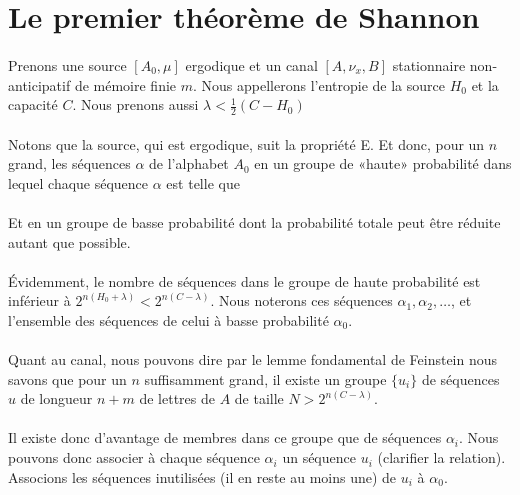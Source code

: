 \documentclass[a4paper,12pt]{article}
\begin{document}
\section{Le premier théorème de Shannon}

	\paragraph{}
	Prenons une source $[A_0,\mu]$ ergodique et un canal $[A,\nu_x,B]$ stationnaire non-anticipatif de mémoire finie $m$. 
	Nous appellerons l'entropie de la source $H_0$ et la capacité $C$. Nous prenons aussi $\lambda<\frac{1}{2}(C-H_0)$

	\paragraph{}
	Notons que la source, qui est ergodique, suit la propriété E. Et donc, pour un $n$ grand,  les séquences $\alpha$ de l'alphabet 
	$A_0$ en un groupe de «haute» probabilité dans lequel chaque séquence $\alpha$ est telle que
	
	\paragraph{}
	Et en un groupe de basse probabilité dont la probabilité totale peut être réduite autant que possible.

	\paragraph{}
	Évidemment, le nombre de séquences dans le groupe de haute probabilité est inférieur à $2^{n(H_0+\lambda)}<2^{n(C-\lambda)}$.
	Nous noterons ces séquences $\alpha_1,\alpha_2,\dots$, et l'ensemble des séquences de celui à basse probabilité $\alpha_0$.
	
	\paragraph{}
	Quant au canal, nous pouvons dire par le lemme fondamental de Feinstein nous savons que pour un $n$ suffisamment grand, 
	il existe un groupe $\{u_i\}$ de séquences $u$ de longueur $n+m$ de lettres de $A$ de taille $N > 2^{n(C-\lambda)}$.
	
	\paragraph{}
	Il existe donc d'avantage de membres dans ce groupe que de séquences $\alpha_i$. Nous pouvons donc associer à chaque séquence $\alpha_i$
	un séquence $u_i$ (clarifier la relation). Associons les séquences inutilisées (il en reste au moins une) de $u_i$ à $\alpha_0$.
	
\end{document}
